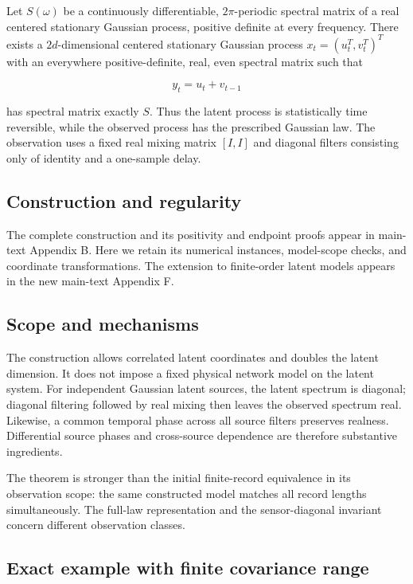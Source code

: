 \documentclass[11pt,a4paper]{article}
\begin{document}
Let \(S(\omega)\) be a continuously differentiable, \(2\pi\)-periodic spectral matrix of a real centered stationary Gaussian process, positive definite at every frequency. There exists a \(2d\)-dimensional centered stationary Gaussian process \(x_t=(u_t^T,v_t^T)^T\) with an everywhere positive-definite, real, even spectral matrix such that

\[
y_t=u_t+v_{t-1}
\]

has spectral matrix exactly \(S\). Thus the latent process is statistically time reversible, while the observed process has the prescribed Gaussian law. The observation uses a fixed real mixing matrix \([I,I]\) and diagonal filters consisting only of identity and a one-sample delay.

\subsection{Construction and regularity}
The complete construction and its positivity and endpoint proofs appear in main-text Appendix B. Here we retain its numerical instances, model-scope checks, and coordinate transformations. The extension to finite-order latent models appears in the new main-text Appendix F.

\subsection{Scope and mechanisms}

The construction allows correlated latent coordinates and doubles the latent dimension. It does not impose a fixed physical network model on the latent system. For independent Gaussian latent sources, the latent spectrum is diagonal; diagonal filtering followed by real mixing then leaves the observed spectrum real. Likewise, a common temporal phase across all source filters preserves realness. Differential source phases and cross-source dependence are therefore substantive ingredients.

The theorem is stronger than the initial finite-record equivalence in its observation scope: the same constructed model matches all record lengths simultaneously. The full-law representation and the sensor-diagonal invariant concern different observation classes.

\subsection{Exact example with finite covariance range}
\end{document}
